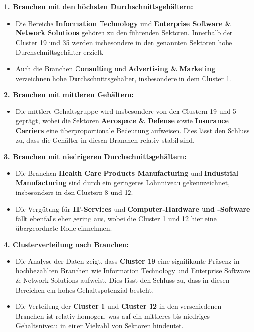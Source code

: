 \documentclass[
]{article}
\providecommand{\tightlist}{%
  \setlength{\itemsep}{0pt}\setlength{\parskip}{0pt}}
\begin{document}
\textbf{1. Branchen mit den höchsten Durchschnittsgehältern:}

\begin{itemize}
\item
  Die Bereiche \textbf{Information Technology} und \textbf{Enterprise
  Software \& Network Solutions} gehören zu den führenden Sektoren.
  Innerhalb der Cluster 19 und 35 werden insbesondere in den genannten
  Sektoren hohe Durchschnittsgehälter erzielt.
\item
  Auch die Branchen \textbf{Consulting} und \textbf{Advertising \&
  Marketing} verzeichnen hohe Durchschnittsgehälter, insbesondere in dem
  Cluster 1.
\end{itemize}

\textbf{2. Branchen mit mittleren Gehältern:}

\begin{itemize}
\tightlist
\item
  Die mittlere Gehaltsgruppe wird insbesondere von den Clustern 19 und 5
  geprägt, wobei die Sektoren \textbf{Aerospace \& Defense} sowie
  \textbf{Insurance Carriers} eine überproportionale Bedeutung
  aufweisen. Dies lässt den Schluss zu, dass die Gehälter in diesen
  Branchen relativ stabil sind.
\end{itemize}

\textbf{3. Branchen mit niedrigeren Durchschnittsgehältern:}

\begin{itemize}
\item
  Die Branchen \textbf{Health Care Products Manufacturing} und
  \textbf{Industrial Manufacturing} sind durch ein geringeres Lohnniveau
  gekennzeichnet, insbesondere in den Clustern 8 und 12.
\item
  Die Vergütung für \textbf{IT-Services} und \textbf{Computer-Hardware
  und -Software} fällt ebenfalls eher gering aus, wobei die Cluster 1
  und 12 hier eine übergeordnete Rolle einnehmen.
\end{itemize}

\textbf{4. Clusterverteilung nach Branchen:}

\begin{itemize}
\item
  Die Analyse der Daten zeigt, dass \textbf{Cluster 19} eine
  signifikante Präsenz in hochbezahlten Branchen wie Information
  Technology und Enterprise Software \& Network Solutions aufweist. Dies
  lässt den Schluss zu, dass in diesen Bereichen ein hohes
  Gehaltspotenzial besteht.
\item
  Die Verteilung der \textbf{Cluster 1} und \textbf{Cluster 12} in den
  verschiedenen Branchen ist relativ homogen, was auf ein mittleres bis
  niedriges Gehaltsniveau in einer Vielzahl von Sektoren hindeutet.
\end{itemize}
\end{document}
